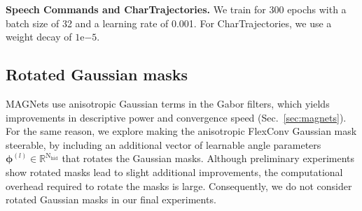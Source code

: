 \documentclass{article} \usepackage{iclr2022_conference,times}
\def\sR{{\mathbb{R}}}
\def\Nt{\mathrm{N}}
\def\sR{{\mathbb{R}}}
\begin{document}
\textbf{Speech Commands and CharTrajectories.} We train for 300 epochs with a batch size of 32 and a learning rate of 0.001. For CharTrajectories, we use a weight decay of $1\mathrm{e}{-5}$.

\subsection{Rotated Gaussian masks}
\label{sec:negative-steerable-gaussians}

MAGNets use anisotropic Gaussian terms in the Gabor filters, which yields improvements in descriptive power and convergence speed (Sec.~\ref{sec:magnets}). For the same reason, we explore making the anisotropic FlexConv Gaussian mask steerable, by including an additional vector of learnable angle parameters $\boldsymbol{\phi}^{(l)} \in \sR^{\Nt_{\mathrm{hid}}}$ that rotates the Gaussian masks. Although preliminary experiments show rotated masks lead to slight additional improvements, the computational overhead required to rotate the masks is large. Consequently, we do not consider rotated Gaussian masks in our final experiments.
\end{document}
